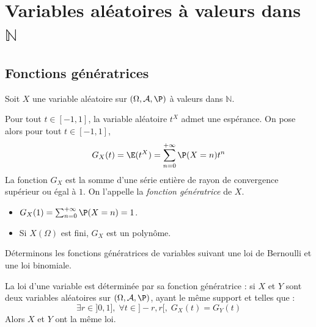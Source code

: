 \documentclass[french,11pt,twoside]{VcCours}
\begin{document}
\section{Variables aléatoires à valeurs dans \texorpdfstring{$\mathbb{N}$}{ℕ}}
\subsection{Fonctions génératrices}
\begin{TheoremeDefinition}{} Soit $X$ une variable aléatoire sur $(\Omega, \mathcal{A}, \P)$ à valeurs dans $\mathbb{N}$.

Pour tout $t \in [-1,1]$, la variable aléatoire $t^X$ admet une espérance. On pose alors pour tout $t \in [-1,1]$,
$$ G_X(t)= \E(t^X) = \sum_{n=0}^{+ \infty} \P(X=n) t^n$$
La fonction $G_X$ est la somme d'une série entière de rayon de convergence supérieur ou égal à $1$. On l'appelle la \emph{fonction génératrice} de $X$.
\end{TheoremeDefinition}{}

\begin{Demonstration}{}
\vspace*{5cm}
\end{Demonstration}

\begin{Remarques}{}
\begin{itemize}
\item $G_X(1)= \sum_{n=0}^{+ \infty} \P(X=n)=1$.
\item Si $X(\Omega)$ est fini, $G_X$ est un polynôme.
\end{itemize}
\end{Remarques}

\begin{Exemple}{} Déterminons les fonctions génératrices de variables suivant une loi de Bernoulli et une loi binomiale.


\vspace*{5cm}
\end{Exemple}

\begin{Proposition}{} La loi d'une variable est déterminée par sa fonction génératrice : si $X$ et $Y$ sont deux variables aléatoires sur $(\Omega, \mathcal{A}, \P)$, ayant le même support et telles que :
$$ \exists r \in ]0,1], \; \forall t \in ]-r,r[, \; G_X(t)=G_Y(t)$$
Alors $X$ et $Y$ ont la même loi.
\end{Proposition}

\begin{Demonstration}{}

\vspace*{3cm}
\end{Demonstration}
\end{document}
